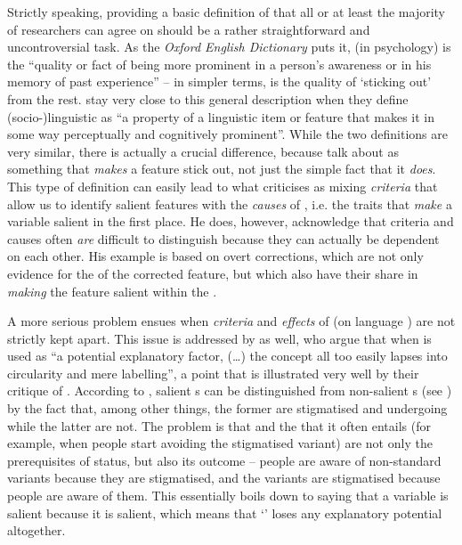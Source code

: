 Strictly speaking, providing a basic definition of  that all or at least the majority of researchers can agree on should be a rather straightforward and uncontroversial task.
As the \emph{Oxford English Dictionary} puts it,  (in psychology) is the ``quality or fact of being more prominent in a person's awareness or in his memory of past experience'' -- in simpler terms,  is the quality of `sticking out' from the rest.
\textcite[81]{kerswillwilliams2002} stay very close to this general description when they define (socio-)linguistic  as ``a property of a linguistic item or feature that makes it in some way perceptually and cognitively prominent''.
While the two definitions are very similar, there is actually a crucial difference, because \citeauthor{kerswillwilliams2002} talk about  as something that \emph{makes} a feature stick out, not just the simple fact that it \emph{does}.
This type of definition can easily lead to what \textcite[cf.][9]{auer2014} criticises as mixing \emph{criteria} that allow us to identify salient features with the \emph{causes} of , i.e. the traits that \emph{make} a variable salient in the first place.
He does, however, acknowledge that criteria and causes often \emph{are} difficult to distinguish because they can actually be dependent on each other.
His example is based on overt corrections, which are not only evidence for the  of the corrected feature, but which also have their share in \emph{making} the feature salient within the .

A more serious problem ensues when \emph{criteria} and \emph{effects} of  (on language ) are not strictly kept apart.
This issue is addressed by \textcite[82]{kerswillwilliams2002} as well, who argue that when  is used as ``a potential explanatory factor, (\ldots) the concept all too easily lapses into circularity and mere labelling'', a point that is illustrated very well by their critique of \textcite{trudgill1986}.
According to \citeauthor{trudgill1986}, salient s can be distinguished from non-salient s (see ) by the fact that, among other things, the former are stigmatised and undergoing  while the latter are not.
The problem is that  and the  that it often entails (for example, when people start avoiding the stigmatised variant) are not only the prerequisites of  status, but also its outcome -- people are aware of non-standard variants because they are stigmatised, and the variants are stigmatised because people are aware of them.
This essentially boils down to saying that a variable is salient because it is salient, which means that `' loses any explanatory potential altogether.

